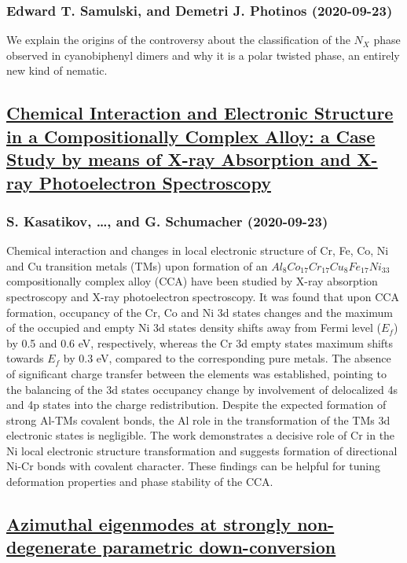 \subsubsection*{Edward T. Samulski, and Demetri J. Photinos (2020-09-23)}
We explain the origins of the controversy about the classification of the
$N_X$ phase observed in cyanobiphenyl dimers and why it is a polar twisted
phase, an entirely new kind of nematic.

\subsection*{\href{http://arxiv.org/abs/2009.11398v1}{Chemical Interaction and Electronic Structure in a Compositionally  Complex Alloy: a Case Study by means of X-ray Absorption and X-ray  Photoelectron Spectroscopy}}
\subsubsection*{S. Kasatikov, \dots, and G. Schumacher (2020-09-23)}
Chemical interaction and changes in local electronic structure of Cr, Fe, Co,
Ni and Cu transition metals (TMs) upon formation of an
$Al_{8}Co_{17}Cr_{17}Cu_{8}Fe_{17}Ni_{33}$ compositionally complex alloy (CCA)
have been studied by X-ray absorption spectroscopy and X-ray photoelectron
spectroscopy. It was found that upon CCA formation, occupancy of the Cr, Co and
Ni 3d states changes and the maximum of the occupied and empty Ni 3d states
density shifts away from Fermi level ($E_f$) by 0.5 and 0.6 eV, respectively,
whereas the Cr 3d empty states maximum shifts towards $E_f$ by 0.3 eV, compared
to the corresponding pure metals. The absence of significant charge transfer
between the elements was established, pointing to the balancing of the 3d
states occupancy change by involvement of delocalized 4s and 4p states into the
charge redistribution. Despite the expected formation of strong Al-TMs covalent
bonds, the Al role in the transformation of the TMs 3d electronic states is
negligible. The work demonstrates a decisive role of Cr in the Ni local
electronic structure transformation and suggests formation of directional Ni-Cr
bonds with covalent character. These findings can be helpful for tuning
deformation properties and phase stability of the CCA.

\subsection*{\href{http://arxiv.org/abs/2009.11396v1}{Azimuthal eigenmodes at strongly non-degenerate parametric  down-conversion}}
